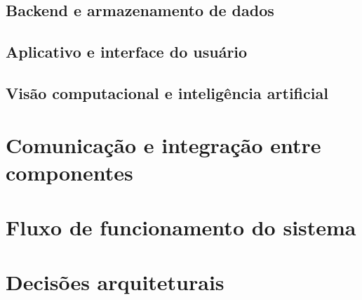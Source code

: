 
\subsection{Backend e armazenamento de dados}
\label{subsec:backend_arquitetura}


\subsection{Aplicativo e interface do usuário}
\label{subsec:aplicativo_arquitetura}


\subsection{Visão computacional e inteligência artificial}
\label{subsec:ia_arquitetura}


\section{Comunicação e integração entre componentes}
\label{sec:comunicacao_integracao}


\section{Fluxo de funcionamento do sistema}
\label{sec:fluxo_funcionamento}


%

\section{Decisões arquiteturais}
\label{sec:decisoes_arquiteturais}

